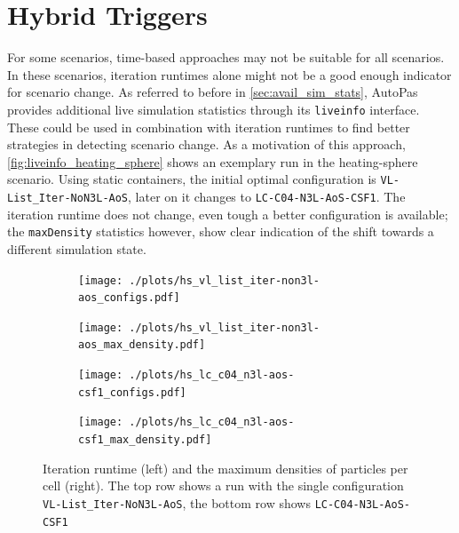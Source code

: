 

\section{Hybrid Triggers}
\label{sec:liveinfo_benchmarks}

For some scenarios, time-based approaches may not be suitable for all scenarios. In these scenarios, iteration runtimes alone might not be a good enough indicator for scenario change. As referred to before in \autoref{sec:avail_sim_stats}, AutoPas provides additional live simulation statistics through its \texttt{liveinfo} interface. These could be used in combination with iteration runtimes to find better strategies in detecting scenario change.
As a motivation of this approach, \autoref{fig:liveinfo_heating_sphere} shows an exemplary run in the heating-sphere scenario.
Using static containers, the initial optimal configuration is \texttt{VL-List\_Iter-NoN3L-AoS}, later on it changes to \texttt{LC-C04-N3L-AoS-CSF1}. \cite{Newcome2025}
The iteration runtime does not change, even tough a better configuration is available; the \texttt{maxDensity} statistics however, show clear indication of the shift towards a different simulation state.


\begin{figure}[htpb]
	\centering
	\begin{subfigure}{0.5\textwidth}
		\texttt{[image: ./plots/hs\_vl\_list\_iter-non3l-aos\_configs.pdf]}
	\end{subfigure}%
	\begin{subfigure}{0.5\textwidth}
		\texttt{[image: ./plots/hs\_vl\_list\_iter-non3l-aos\_max\_density.pdf]}
	\end{subfigure}
	\begin{subfigure}{0.5\textwidth}
		\texttt{[image: ./plots/hs\_lc\_c04\_n3l-aos-csf1\_configs.pdf]}
	\end{subfigure}%
	\begin{subfigure}{0.5\textwidth}
		\texttt{[image: ./plots/hs\_lc\_c04\_n3l-aos-csf1\_max\_density.pdf]}
	\end{subfigure}
	\caption{Iteration runtime (left) and the maximum densities of particles per cell (right). The top row shows a run with the single configuration \texttt{VL-List\_Iter-NoN3L-AoS}, the bottom row shows \texttt{LC-C04-N3L-AoS-CSF1}}
	\label{fig:liveinfo_heating_sphere}
\end{figure}





